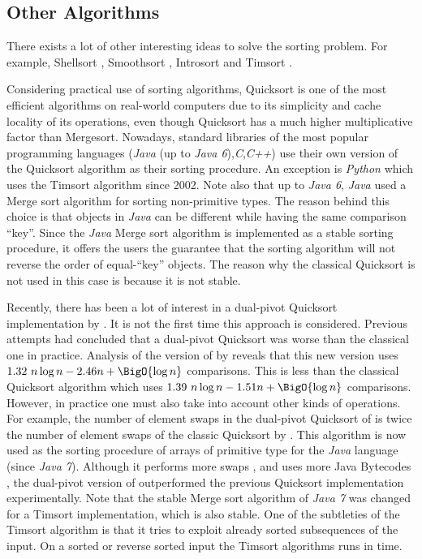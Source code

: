 \subsection*{Other Algorithms}

There exists a lot of other interesting ideas to solve the sorting problem. For
example, Shellsort \cite{shell:1959}, Smoothsort \cite{dijkstra:1982},
Introsort \cite{musser:1997} and Timsort \cite{martelli:2006}.

Considering practical use of sorting algorithms, Quicksort is one of the most
efficient algorithms on real-world computers due to its simplicity and cache
locality of its operations, even though Quicksort has a much higher
multiplicative factor than Mergesort. Nowadays, standard libraries of the most
popular programming languages (\emph{Java} (up to \emph{Java
6}),\emph{C},\emph{C++}) use their own version of the Quicksort algorithm as
their sorting procedure. An exception is \emph{Python} which uses the Timsort
algorithm since 2002. Note also that up to \emph{Java 6}, \emph{Java} used a
Merge sort algorithm for sorting non-primitive types. The reason behind this
choice is that objects in \emph{Java} can be different while having the same
comparison ``key''. Since the \emph{Java} Merge sort algorithm is implemented as
a stable sorting procedure, it offers the users the guarantee that the sorting
algorithm will not reverse the order of equal-``key'' objects. The reason why
the classical Quicksort is not used in this case is because it is not stable.

Recently, there has been a lot of interest in a dual-pivot Quicksort
implementation by \citet*{yaroslavskiy:2009}. It is not the first time this
approach is considered. Previous attempts \cite{sedgewick:1980} had concluded
that a dual-pivot Quicksort was worse than the classical one in practice.
Analysis of the version of \citet*{yaroslavskiy:2009} by \citet*{wild:2012}
reveals that this new version uses \(1.32~n \log n - 2.46n + \BigO{\log n}\)
comparisons.  This is less than the classical Quicksort algorithm which uses
\(1.39~n \log n
- 1.51n + \BigO{\log n}\) comparisons. However, in practice one must also take into account
  other kinds of operations. For example, the number of element swaps in the
dual-pivot Quicksort of \citeauthor{yaroslavskiy:2009} is twice the number of
element swaps of the classic Quicksort by \citeauthor{hoare:1962}. This
algorithm is now used as the sorting procedure of arrays of primitive type for
the \emph{Java} language (since \emph{Java 7}). Although it performs more
swaps \cite{wild:2012}, and uses more Java Bytecodes \cite{wild:2013}, the
dual-pivot version of \citet*{yaroslavskiy:2009} outperformed the previous
Quicksort implementation experimentally. Note that the stable Merge sort
algorithm of \emph{Java 7} was changed for a Timsort implementation, which is
also stable. One of the subtleties of the Timsort algorithm is that it tries
to exploit already sorted subsequences of the input. On a sorted or reverse
sorted input the Timsort algorithms runs in  time.

